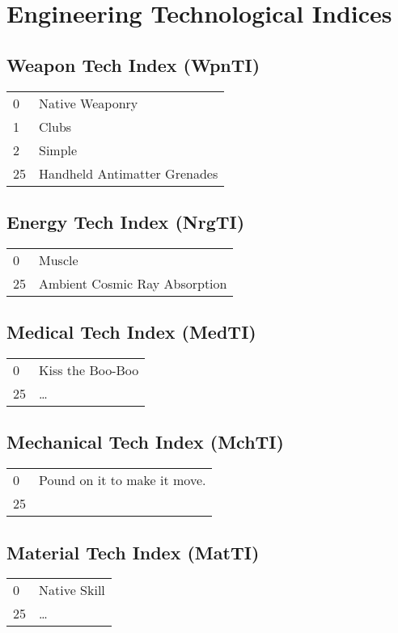 \section{Engineering Tech\-no\-log\-i\-cal Indices}

\subsection{Weapon Tech Index     (WpnTI) }
\begin{tabular}{ll}
	0	& Native Weaponry \\
	1	& Clubs \\
	2	& Simple  \\
	25	& Handheld Antimatter Grenades   \\
\end{tabular}

\subsection{Energy Tech Index	 (NrgTI)}
\begin{tabular}{ll}
	0	& Muscle \\
	25	& Ambient Cosmic Ray Absorption \\
\end{tabular}

\subsection{Medical Tech Index    (MedTI)}
\begin{tabular}{ll}
	0	& Kiss the Boo-Boo \\
	25	& \dots \\
\end{tabular}

\subsection{Mechanical Tech Index (MchTI)}
\begin{tabular}{ll}
	0  & Pound on it to make it move. \\
	25 & \\
\end{tabular}

\subsection{Material Tech Index (MatTI)}
\begin{tabular}{ll}
	0   & Native Skill \\
	25  & \dots \\
\end{tabular}

